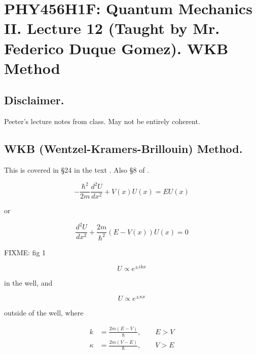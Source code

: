 
%

\chapter{PHY456H1F: Quantum Mechanics II.  Lecture 12 (Taught by Mr. Federico Duque Gomez).  WKB Method}
\label{chap:qmTwoL12}
{}
\date{Oct 19, 2011}

\beginArtWithToc

\section{Disclaimer.}

Peeter's lecture notes from class.  May not be entirely coherent.

\section{WKB (Wentzel-Kramers-Brillouin) Method.}

This is covered in \S 24 in the text \cite{desai2009quantum}.  Also \S 8 of \cite{griffiths2005introduction}.

\begin{equation}\label{eqn:qmTwoL12:10}
-\frac{\hbar^2}{2m} \frac{d^2 U}{dx^2} + V(x) U(x) = E U(x)
\end{equation}

or

\begin{equation}\label{eqn:qmTwoL12:30}
\frac{d^2 U}{dx^2} + \frac{2m}{\hbar^2} (E - V(x)) U(x) = 0
\end{equation}

FIXME: fig 1

\begin{equation}\label{eqn:qmTwoL12:50}
U \propto e^{\pm i k x}
\end{equation}

in the well, and 

\begin{equation}\label{eqn:qmTwoL12:70}
U \propto e^{\pm \kappa x}
\end{equation}

outside of the well, where

\begin{align}\label{eqn:qmTwoL12:90}
k &= \frac{2m (E - V)}{\hbar},\qquad E > V \\
\kappa &= \frac{2m (V - E)}{\hbar}, \qquad V > E
\end{align}

